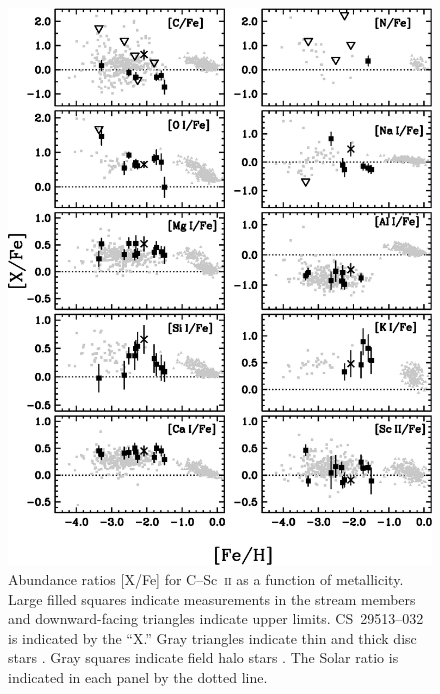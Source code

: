 \documentclass{emulateapj}
\begin{document}
\begin{figure}
\includegraphics[angle=0,width=7.0in]{fig06.eps}
\caption{
\label{abundplot1}
Abundance ratios [X/Fe] for C--Sc~\textsc{ii} as a function of metallicity.
Large filled squares indicate measurements in the stream members and
downward-facing triangles indicate upper limits.
\mbox{CS~29513--032} is indicated by the ``X.''
Gray triangles indicate thin and thick disc stars \citep{reddy03,reddy06}.
Gray squares indicate field halo stars
\citep{cayrel04,barklem05,cohen08,lai08}.
The Solar ratio is indicated in each panel by the dotted line.
}
\end{figure}
\end{document}
